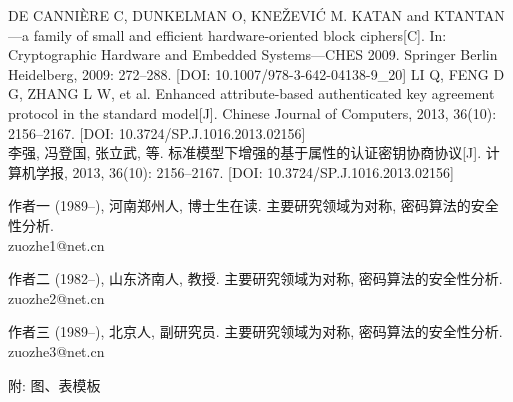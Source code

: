 \documentclass[final]{jcr}
\begin{document}
\begin{thebibliography}{99}
	 DE CANNI{\` E}RE C, DUNKELMAN O, KNE{\v Z}EVI{\'C} M. KATAN and KTANTAN---a family of small and efficient hardware-oriented block ciphers[C]. In: Cryptographic Hardware and Embedded Systems—CHES 2009. Springer Berlin Heidelberg, 2009: 272--288. [DOI: 10.1007/978-3-642-04138-9\_20]
	 LI Q, FENG D G, ZHANG L W, et al. Enhanced attribute-based authenticated key agreement protocol in the standard model[J]. Chinese Journal of Computers, 2013, 36(10): 2156–2167. [DOI: 10.3724/SP.J.1016.2013.02156]\\
李强, 冯登国, 张立武, 等. 标准模型下增强的基于属性的认证密钥协商协议[J]. 计算机学报, 2013, 36(10): 2156--2167. [DOI: 10.3724/SP.J.1016.2013.02156]
\end{thebibliography}
\newpage
\authorinfo
\begin{AuthorInfo}
  \begin{jcrbiography}{作者一} (1989--), 河南郑州人, 博士生在读. 主要研究领域为对称, 密码算法的安全性分析.\\ zuozhe1@net.cn
  \end{jcrbiography}
  \begin{jcrbiography}{作者二} (1982--), 山东济南人, 教授. 主要研究领域为对称, 密码算法的安全性分析. \\  zuozhe2@net.cn
  \end{jcrbiography}
\end{AuthorInfo}
\begin{AuthorInfo}
  \begin{jcrbiography}{作者三} (1989--), 北京人, 副研究员. 主要研究领域为对称, 密码算法的安全性分析.\\ zuozhe3@net.cn
  \end{jcrbiography}

\end{AuthorInfo}
\vspace{10em}
{\noindent\kaishu 附: 图、表模板}
\end{document}
